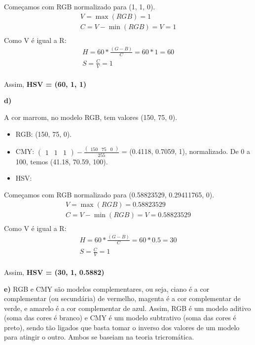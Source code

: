 \documentclass[12pt]{article}
\begin{document}
Começamos com RGB normalizado para (1, 1, 0).
\begin{gather*}
V = \max(RGB) = 1 \\
C = V-\min(RGB) = V = 1\\
\end{gather*}
Como V é igual a R:
\begin{gather*}
H = 60*\frac{(G-B)}{C} = 60*1 = 60\\
S = \frac{C}{V} = 1\\
\end{gather*}

Assim, \textbf{HSV = (60, 1, 1)}

\bigskip
\textbf{d)}

A cor marrom, no modelo RGB, tem valores (150, 75, 0).

\bigskip
\begin{itemize}
    \item RGB: (150, 75, 0).
    \item CMY: $\begin{pmatrix}1 & 1 & 1\end{pmatrix} - \frac{\begin{pmatrix}150 & 75 & 0\end{pmatrix}}{255}$ = (0.4118, 0.7059, 1), normalizado. De 0 a 100, temos (41.18, 70.59, 100).
    \item HSV:
\end{itemize}{}

Começamos com RGB normalizado para (0.58823529, 0.29411765, 0).
\begin{gather*}
V = \max(RGB) = 0.58823529 \\
C = V-\min(RGB) = V = 0.58823529\\
\end{gather*}
Como V é igual a R:
\begin{gather*}
H = 60*\frac{(G-B)}{C} = 60*0.5 = 30\\
S = \frac{C}{V} = 1\\
\end{gather*}

Assim, \textbf{HSV = (30, 1, 0.5882)}

\bigskip
\textbf{e)} RGB e CMY são modelos complementares, ou seja, ciano é a cor complementar (ou secundária) de vermelho, magenta é a cor complementar de verde, e amarelo é a cor complementar de azul. Assim, RGB é um modelo aditivo (soma das cores é branco) e CMY é um modelo subtrativo (soma das cores é preto), sendo tão ligados que basta tomar o inverso dos valores de um modelo para atingir o outro. Ambos se baseiam na teoria tricromática.
    
\end{document}
